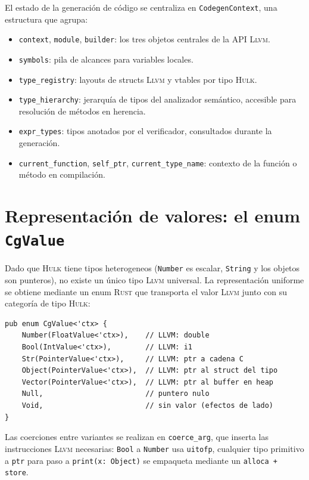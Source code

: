 \documentclass[11pt,a4paper,oneside,openany]{report}
\newcommand{\hulk}{\textsc{Hulk}}
\newcommand{\code}[1]{\texttt{#1}}
\newcommand{\rust}{\textsc{Rust}}
\newcommand{\llvm}{\textsc{Llvm}}
\begin{document}
El estado de la generación de código se centraliza en \code{CodegenContext}, una
estructura que agrupa:

\begin{itemize}
  \item \code{context}, \code{module}, \code{builder}: los tres objetos centrales
    de la API \llvm{}.
  \item \code{symbols}: pila de alcances para variables locales.
  \item \code{type\_registry}: layouts de structs \llvm{} y vtables por tipo \hulk{}.
  \item \code{type\_hierarchy}: jerarquía de tipos del analizador semántico,
    accesible para resolución de métodos en herencia.
  \item \code{expr\_types}: tipos anotados por el verificador, consultados durante
    la generación.
  \item \code{current\_function}, \code{self\_ptr}, \code{current\_type\_name}:
    contexto de la función o método en compilación.
\end{itemize}

\section{Representación de valores: el enum \code{CgValue}}

Dado que \hulk{} tiene tipos heterogeneos (\code{Number} es escalar, \code{String}
y los objetos son punteros), no existe un único tipo \llvm{} universal. La
representación uniforme se obtiene mediante un enum \rust{} que transporta el
valor \llvm{} junto con su categoría de tipo \hulk{}:

\begin{lstlisting}[style=rustst, caption={Representación de valores en codegen.},
  label={lst:cgvalue}]
pub enum CgValue<'ctx> {
    Number(FloatValue<'ctx>),    // LLVM: double
    Bool(IntValue<'ctx>),        // LLVM: i1
    Str(PointerValue<'ctx>),     // LLVM: ptr a cadena C
    Object(PointerValue<'ctx>),  // LLVM: ptr al struct del tipo
    Vector(PointerValue<'ctx>),  // LLVM: ptr al buffer en heap
    Null,                        // puntero nulo
    Void,                        // sin valor (efectos de lado)
}
\end{lstlisting}

Las coerciones entre variantes se realizan en \code{coerce\_arg}, que inserta las
instrucciones \llvm{} necesarias: \code{Bool} a \code{Number} usa \code{uitofp},
cualquier tipo primitivo a \code{ptr} para paso a \code{print(x: Object)} se
empaqueta mediante un \code{alloca + store}.
\end{document}
